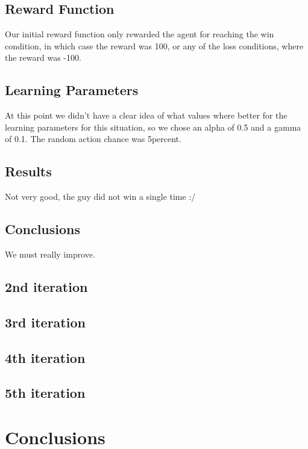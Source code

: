 \documentclass{article}
\begin{document}
  \subsection{Reward Function}

  Our initial reward function only rewarded the agent for reaching the win condition, in which case the reward was 100, or any of the loss conditions,
  where the reward was -100.\\

  \subsection{Learning Parameters}

  At this point we didn't have a clear idea of what values where better for the learning parameters for this situation, so we chose an alpha of 0.5 and a gamma of 0.1.
  The random action chance was 5percent.\\

  \subsection{Results}

  Not very good, the guy did not win a single time :/\\

  \subsection{Conclusions}

  We must really improve.



  \subsection{2nd iteration}

  \subsection{3rd iteration}

  \subsection{4th iteration}

  \subsection{5th iteration}


  \section{Conclusions}
  
\end{document}
